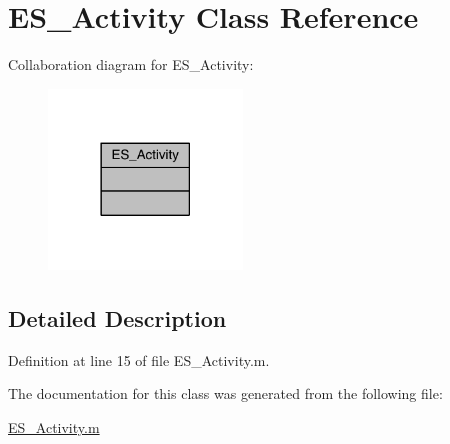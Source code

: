 \hypertarget{class_e_s___activity}{\section{E\+S\+\_\+\+Activity Class Reference}
\label{class_e_s___activity}
}


Collaboration diagram for E\+S\+\_\+\+Activity\+:\nopagebreak
\begin{figure}[H]
\begin{center}
\leavevmode
\includegraphics[width=146pt]{dc/dad/class_e_s___activity__coll__graph}
\end{center}
\end{figure}


\subsection{Detailed Description}


Definition at line 15 of file E\+S\+\_\+\+Activity.\+m.



The documentation for this class was generated from the following file\+:\begin{DoxyCompactItemize}
\item 
\hyperlink{_e_s___activity_8m}{E\+S\+\_\+\+Activity.\+m}\end{DoxyCompactItemize}
